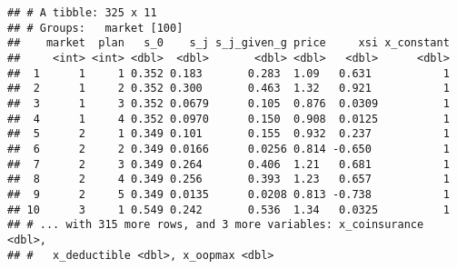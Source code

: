 \documentclass[]{article}
\newenvironment{Shaded}{\begin{snugshade}}{\end{snugshade}}
\newcommand{\DataTypeTok}[1]{\textcolor[rgb]{0.13,0.29,0.53}{#1}}
\newcommand{\DecValTok}[1]{\textcolor[rgb]{0.00,0.00,0.81}{#1}}
\newcommand{\KeywordTok}[1]{\textcolor[rgb]{0.13,0.29,0.53}{\textbf{#1}}}
\newcommand{\NormalTok}[1]{#1}
\newcommand{\OperatorTok}[1]{\textcolor[rgb]{0.81,0.36,0.00}{\textbf{#1}}}
\newcommand{\StringTok}[1]{\textcolor[rgb]{0.31,0.60,0.02}{#1}}
\begin{document}
\begin{Shaded}
\end{Shaded}

\begin{verbatim}
## # A tibble: 325 x 11
## # Groups:   market [100]
##    market  plan   s_0    s_j s_j_given_g price     xsi x_constant
##     <int> <int> <dbl>  <dbl>       <dbl> <dbl>   <dbl>      <dbl>
##  1      1     1 0.352 0.183       0.283  1.09   0.631           1
##  2      1     2 0.352 0.300       0.463  1.32   0.921           1
##  3      1     3 0.352 0.0679      0.105  0.876  0.0309          1
##  4      1     4 0.352 0.0970      0.150  0.908  0.0125          1
##  5      2     1 0.349 0.101       0.155  0.932  0.237           1
##  6      2     2 0.349 0.0166      0.0256 0.814 -0.650           1
##  7      2     3 0.349 0.264       0.406  1.21   0.681           1
##  8      2     4 0.349 0.256       0.393  1.23   0.657           1
##  9      2     5 0.349 0.0135      0.0208 0.813 -0.738           1
## 10      3     1 0.549 0.242       0.536  1.34   0.0325          1
## # ... with 315 more rows, and 3 more variables: x_coinsurance <dbl>,
## #   x_deductible <dbl>, x_oopmax <dbl>
\end{verbatim}
\end{document}
